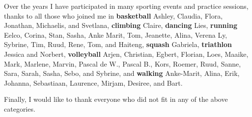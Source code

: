 Over the years I have participated in many sporting events and practice sessions, thanks to all those who joined me in
\textbf{basketball} Ashley, Claudia, Flora, Jonathan, Michaelis, and Svetlana,
\textbf{climbing} Claire,
\textbf{dancing} Lies,
\textbf{running} Eelco, Corina, Stan, Sasha, Anke Marit, Tom, Jeanette, Alina, Verena Ly, Sybrine, Tim, Ruud, Rene, Tom, and Haiteng,
\textbf{squash} Gabriela,
\textbf{triathlon} Jessica and Norbert,
\textbf{volleyball} Arjen, Christian, Egbert, Florian, Loes, Maaike, Mark, Marlene, Marvin, Pascal de W., Pascal B., Kors, Roemer, Ruud, Sanne, Sara, Sarah, Sasha, Sebo, and Sybrine,
and
\textbf{walking} Anke-Marit, Alina, Erik, Johanna, Sebastiaan, Laurence, Mirjam, Desiree, and Bart.

Finally, I would like to thank everyone who did not fit in any of the above categories.
